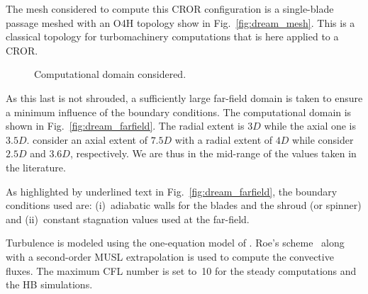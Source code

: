 
The mesh considered to compute this
CROR configuration is a single-blade passage meshed
with an O4H topology show in Fig.~\ref{fig:dream_mesh}. This is a classical
topology for turbomachinery computations that is here applied to 
a CROR.
\begin{figure}[htb]
  \centering
  \caption{Computational domain considered.}
\end{figure}

As this last is not shrouded, a sufficiently large
far-field domain is taken to ensure a minimum influence
of the boundary conditions.
The computational domain is shown in Fig.~\ref{fig:dream_farfield}.
The radial extent is $3D$ while the axial one is $3.5D$.
\citet{Peters2012} consider an axial extent of $7.5D$
with a radial extent of $4D$ while \citet{Zachariadis2011}
consider $2.5D$ and $3.6D$, respectively. We are thus in 
the mid-range of the values taken in the literature.

As highlighted by underlined text in Fig.~\ref{fig:dream_farfield},
the boundary conditions used are: (i)~adiabatic walls
for the blades and the shroud (or spinner) and (ii)~constant
stagnation values used at the far-field.

Turbulence is modeled using the one-equation model of
\citet{Spalart1992}.  Roe's scheme~\cite{Roe1981} along with a 
second-order MUSL extrapolation 
is used to compute the convective fluxes.
The maximum CFL number is set to~10 for the steady 
computations and the HB simulations.
